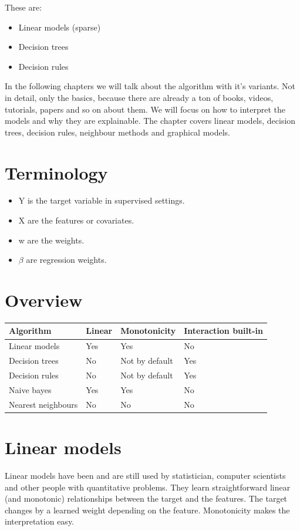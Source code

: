 \documentclass[12pt,]{krantz}
\providecommand{\tightlist}{%
  \setlength{\itemsep}{0pt}\setlength{\parskip}{0pt}}
\theoremstyle{definition}
\theoremstyle{definition}
\theoremstyle{definition}
\theoremstyle{remark}
\begin{document}
These are:

\begin{itemize}
\tightlist
\item
  Linear models (sparse)
\item
  Decision trees
\item
  Decision rules
\end{itemize}

In the following chapters we will talk about the algorithm with it's
variants. Not in detail, only the basics, because there are already a
ton of books, videos, tutorials, papers and so on about them. We will
focus on how to interpret the models and why they are explainable. The
chapter covers linear models, decision trees, decision rules, neighbour
methods and graphical models.

\section{Terminology}\label{terminology}

\begin{itemize}
\tightlist
\item
  Y is the target variable in supervised settings.
\item
  X are the features or covariates.
\item
  w are the weights.
\item
  \(\beta\) are regression weights.
\end{itemize}

\section{Overview}\label{overview}

\begin{longtable}[]{@{}llll@{}}
\toprule
Algorithm & Linear & Monotonicity & Interaction built-in\tabularnewline
\midrule
\endhead
Linear models & Yes & Yes & No\tabularnewline
Decision trees & No & Not by default & Yes\tabularnewline
Decision rules & No & Not by default & Yes\tabularnewline
Naive bayes & Yes & Yes & No\tabularnewline
Nearest neighbours & No & No & No\tabularnewline
\bottomrule
\end{longtable}

\section{Linear models}\label{limo}

Linear models have been and are still used by statistician, computer
scientists and other people with quantitative problems. They learn
straightforward linear (and monotonic) relationships between the target
and the features. The target changes by a learned weight depending on
the feature. Monotonicity makes the interpretation easy.
\end{document}
